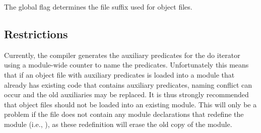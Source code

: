 The global flag
 determines the
file suffix used for {\eclipse} object files.


\subsection{Restrictions}

Currently, the compiler generates the auxiliary predicates for the do
iterator using a module-wide counter to name the predicates. Unfortunately this
means that if an object file with auxiliary predicates is loaded into a
module that already has existing code that contains auxiliary predicates,
naming conflict can occur and the old auxiliaries may be replaced. It is
thus strongly recommended that object files should not be loaded into an
existing module. This will only be a problem if the file does not contain
any module declarations that redefine the module (i.e.,
),
as these redefinition will erase the old copy of
the module.


%
%


